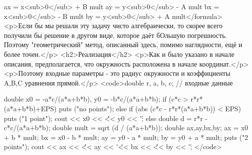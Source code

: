 ax = x<sub>0</sub> + B mult
ay = y<sub>0</sub> - A mult
bx = x<sub>0</sub> - B mult
by = y<sub>0</sub> + A mult</formula>
<p>Если бы мы решали эту задачу чисто алгебраически, то скорее всего получили бы решение в другом виде, которое даёт бОльшую погрешность. Поэтому "геометрический" метод, описанный здесь, помимо наглядности, ещё и более точен.</p>
<h2>Реализация</h2>
<p>Как и было указано в начале описания, предполагается, что окружность расположена в начале координат.</p>
<p>Поэтому входные параметры - это радиус окружности и коэффициенты A,B,C уравнения прямой.</p>
<code>double r, a, b, c; // входные данные

double x0 = -a*c/(a*a+b*b),  y0 = -b*c/(a*a+b*b);
if (c*c > r*r*(a*a+b*b)+EPS)
	puts ("no points");
else if (abs (c*c - r*r*(a*a+b*b)) < EPS) {
	puts ("1 point");
	cout << x0 << \' \' << y0 << \'\n\';
}
else {
	double d = r*r - c*c/(a*a+b*b);
	double mult = sqrt (d / (a*a+b*b));
	double ax,ay,bx,by;
	ax = x0 + b * mult;
	bx = x0 - b * mult;
	ay = y0 - a * mult;
	by = y0 + a * mult;
	puts ("2 points");
	cout << ax << \' \' << ay << \'\n\' << bx << \' \' << by << \'\n\';
}</code>